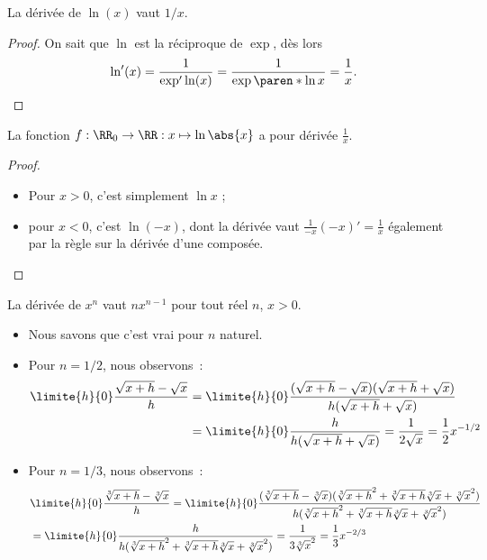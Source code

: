 \begin{frame}
  \begin{example}
    La dérivée de \(\ln(x)\) vaut \(1/x\).
  \end{example}
  \begin{proof}
    On sait que \(\ln\) est la réciproque de \(\exp\), dès lors
    \begin{equation*}
      \ln'(x) = \frac{1}{\exp'{\ln(x)}} = \frac{1}{\exp{\paren*{\ln x}}} = \frac{1}{x}.
    \end{equation*}
  \end{proof}
  \begin{example}%
    La fonction \(f : \RR_0 \to \RR : x \mapsto \ln\abs{x}\) a pour dérivée \(\frac{1}{x}\).
  \end{example}
  \begin{proof}
    \begin{itemize}
    \item Pour \(x > 0\), c'est simplement \(\ln x\) ;\pause
    \item pour \(x < 0\), c'est \(\ln (-x)\), \pause{} dont la dérivée vaut \(\frac{1}{-x} (-x)' = \frac{1}{x}\) également par la règle sur la dérivée d'une composée.
    \end{itemize}
  \end{proof}
\end{frame}
\begin{frame}%
  \begin{proposition}
    La dérivée de \(x^{n}\) vaut \(n x^{n-1}\) pour tout réel \(n\), \(x > 0\).
  \end{proposition}
  \begin{example}
    \begin{itemize}[<+->]
    \item Nous savons que c'est vrai pour \(n\) naturel.
    \item Pour \(n = 1/2\), nous observons~:
      \begin{align*}
        \limite{h}{0} \frac{\sqrt{x+h}-\sqrt{x}}{h} 
        & = \limite{h}{0} \frac{(\sqrt{x+h}-\sqrt{x})(\sqrt{x+h}+\sqrt{x})}{h(\sqrt{x+h}+\sqrt{x})} \\
        &= \limite{h}{0} \frac{h}{h(\sqrt{x+h}+\sqrt{x})} = \frac{1}{2\sqrt{x}} = \frac{1}{2} x^{-1/2}
      \end{align*}
    \item Pour \(n = 1/3\), nous observons~:
      \begin{align*}
        &\limite{h}{0} \frac{\sqrt[3]{x+h}-\sqrt[3]{x}}{h} 
        = \limite{h}{0} \frac
          {(\sqrt[3]{x+h}-\sqrt[3]{x})(\sqrt[3]{x+h}^{2}+\sqrt[3]{x+h}\sqrt[3]{x}+\sqrt[3]{x}^{2})}
          {h(\sqrt[3]{x+h}^{2}+\sqrt[3]{x+h}\sqrt[3]{x}+\sqrt[3]{x}^{2})}\\
        &= \limite{h}{0} \frac{h}{h(\sqrt[3]{x+h}^{2}+\sqrt[3]{x+h}\sqrt[3]{x}+\sqrt[3]{x}^{2})} = \frac{1}{3\sqrt[3]{x}^{2}} = \frac{1}{3} x^{-2/3}
      \end{align*}
    \end{itemize}
  \end{example}
\end{frame}
